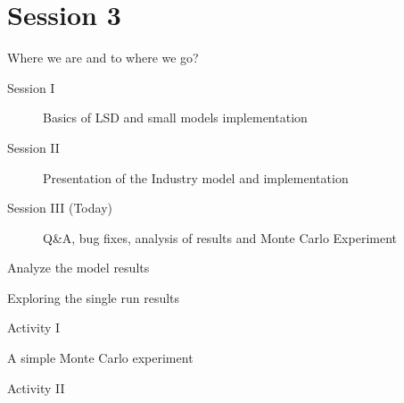 \documentclass[bigger,aspectratio=169]{beamer}
\begin{document}
\section{Session 3}
\label{sec:org994b53f}

\begin{frame}[label={sec:org78d4b94}]{Where we are and to where we go?}
\begin{description}
\item[{Session I}] Basics of LSD and small models implementation
\item[{Session II}] Presentation of the Industry model and implementation
\item[{Session III (Today)}] Q\&A, bug fixes, analysis of results and Monte Carlo Experiment
\end{description}
\end{frame}
\begin{frame}[label={sec:orgd2ea1d9}]{Analyze the model results}
\end{frame}

\begin{frame}[label={sec:org66d27a2}]{Exploring the single run results}
\end{frame}

\begin{frame}[label={sec:orge6148a7}]{Activity I}
\end{frame}

\begin{frame}[label={sec:org9d5b04c}]{A simple Monte Carlo experiment}
\end{frame}

\begin{frame}[label={sec:org240e4bd}]{Activity II}
\end{frame}
\end{document}

